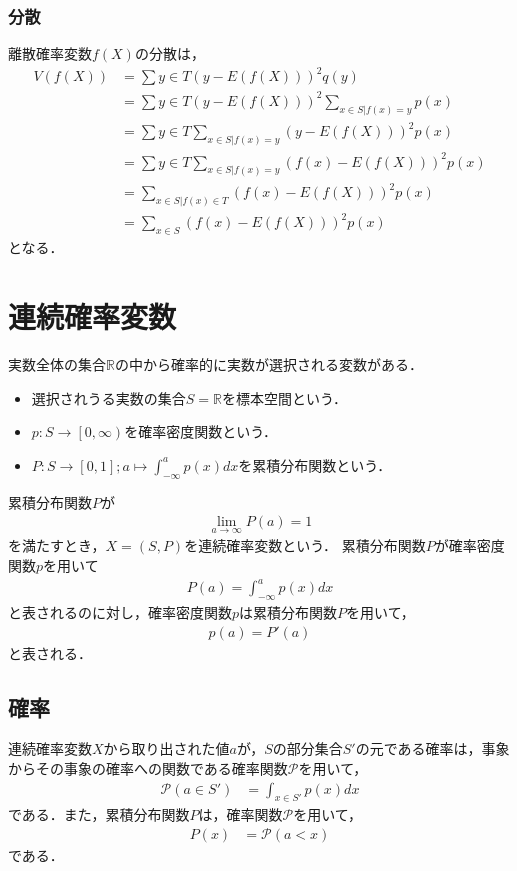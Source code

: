 \documentclass[dvipdfmx]{jsarticle}
\begin{document}
 \subsubsection{分散}
離散確率変数$f\left(X\right)$の分散は，
 \begin{align}
  V\left(f\left(X\right)\right)&=\sum{y\in T}\left(y-E\left(f\left(X\right)\right)\right)^2q\left(y\right)\nonumber\\
  &=\sum{y\in T}\left(y-E\left(f\left(X\right)\right)\right)^2\sum_{x\in S|f\left(x\right)=y}p\left(x\right)\nonumber\\
  &=\sum{y\in T}\sum_{x\in S|f\left(x\right)=y}\left(y-E\left(f\left(X\right)\right)\right)^2p\left(x\right)\nonumber\\
  &=\sum{y\in T}\sum_{x\in S|f\left(x\right)=y}\left(f\left(x\right)-E\left(f\left(X\right)\right)\right)^2p\left(x\right)\nonumber\\
  &=\sum_{x\in S|f\left(x\right)\in T}\left(f\left(x\right)-E\left(f\left(X\right)\right)\right)^2p\left(x\right)\nonumber\\
  &=\sum_{x\in S}\left(f\left(x\right)-E\left(f\left(X\right)\right)\right)^2p\left(x\right)
 \end{align}
となる．
 \section{連続確率変数}
実数全体の集合$\mathbb{R}$の中から確率的に実数が選択される変数がある．
 \begin{itemize}
  \item 選択されうる実数の集合$S=\mathbb{R}$を標本空間という．
  \item $p:S\to\left[0,\infty\right)$を確率密度関数という．
  \item $P:S\to\left[0,1\right];a\mapsto\int_{-\infty}^ap\left(x\right)dx$を累積分布関数という．
 \end{itemize}
累積分布関数$P$が
 \begin{align}
  \lim_{a\to\infty}P\left(a\right)=1
 \end{align}
を満たすとき，$X=\left(S,P\right)$を連続確率変数という．
累積分布関数$P$が確率密度関数$p$を用いて
 \begin{align}
  P\left(a\right)=\int_{-\infty}^ap\left(x\right)dx
 \end{align}
と表されるのに対し，確率密度関数$p$は累積分布関数$P$を用いて，
 \begin{align}
  p\left(a\right)=P'\left(a\right)
 \end{align}
と表される．
 \subsection{確率}
連続確率変数$X$から取り出された値$a$が，$S$の部分集合$S'$の元である確率は，事象からその事象の確率への関数である確率関数$\mathscr{P}$を用いて，
 \begin{align}
  \mathscr{P}\left(a\in S'\right)&=\int_{x\in S'}p\left(x\right)dx
 \end{align}
である．また，累積分布関数$P$は，確率関数$\mathscr{P}$を用いて，
 \begin{align}
  P\left(x\right)&=\mathscr{P}\left(a<x\right)
 \end{align}
である．
\end{document}
